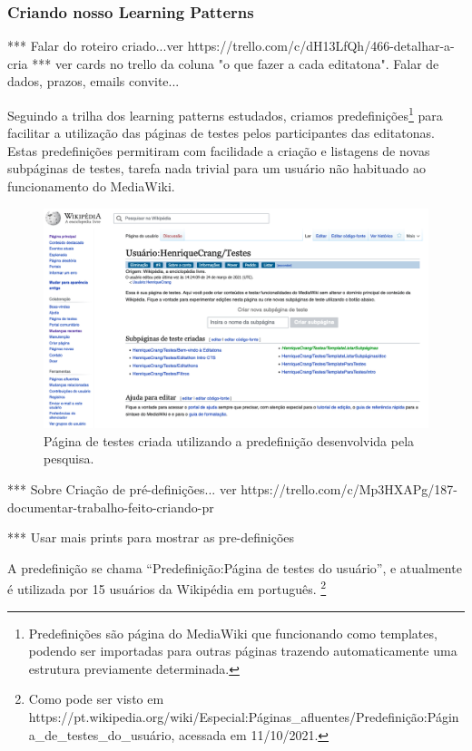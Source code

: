 \subsubsection{Criando nosso Learning Patterns}

*** Falar do roteiro criado...ver https://trello.com/c/dH13LfQh/466-detalhar-a-cria%
*** ver cards no trello da coluna "o que fazer a cada editatona". Falar de dados, prazos, emails convite...

Seguindo a trilha dos learning patterns estudados, criamos predefinições\footnote{Predefinições são página do MediaWiki que funcionando como templates, podendo ser importadas para outras páginas trazendo automaticamente uma estrutura previamente determinada.} para facilitar a utilização das páginas de testes pelos participantes das editatonas. Estas predefinições permitiram com facilidade a criação e listagens de novas subpáginas de testes, tarefa nada trivial para um usuário não habituado ao funcionamento do MediaWiki.

\begin{figure}[H]
    \centering
    \includegraphics[width=1\textwidth]{Images/pagina_de_Testes.png}
    \caption{Página de testes criada utilizando a predefinição desenvolvida pela pesquisa.}
    \label{fig:pagina_de_testes_editatona}
\end{figure}


*** Sobre Criação de pré-definições... ver https://trello.com/c/Mp3HXAPg/187-documentar-trabalho-feito-criando-pr%

*** Usar mais prints para mostrar as pre-definições


A predefinição se chama ``Predefinição:Página de testes do usuário'', e atualmente é utilizada por 15 usuários da Wikipédia em português. \footnote{Como pode ser visto em https://pt.wikipedia.org/wiki/Especial:Páginas\_afluentes/Predefinição:Página\_de\_testes\_do\_usuário, acessada em 11/10/2021.}

